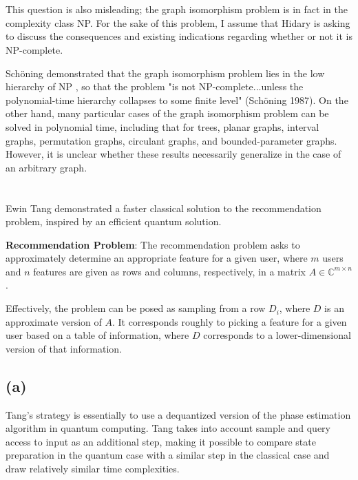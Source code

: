 \documentclass{article}
\begin{document}
 
\section{}

This question is also misleading; the graph isomorphism problem is in fact in the complexity class NP. For the sake of this problem, I assume that Hidary is asking to discuss the consequences and existing indications regarding whether or not it is NP-complete.

Schöning demonstrated that the graph isomorphism problem lies in the low hierarchy of NP , so that the problem "is not NP-complete...unless the polynomial-time hierarchy collapses to some finite level" (Schöning 1987). On the other hand, many particular cases of the graph isomorphism problem can be solved in polynomial time, including that for trees, planar graphs, interval graphs, permutation graphs, circulant graphs, and bounded-parameter graphs. However, it is unclear whether these results necessarily generalize in the case of an arbitrary graph.

\section{}
Ewin Tang demonstrated a faster classical solution to the recommendation problem, inspired by an efficient quantum solution.

\textbf{Recommendation Problem}: The recommendation problem asks to approximately determine an appropriate feature for a given user, where $m$ users and $n$ features are given as rows and columns, respectively, in a matrix $A\in \mathbb{C}^{m\times n}$.

Effectively, the problem can be posed as sampling from a row $D_i$, where $D$ is an approximate version of $A$. It corresponds roughly to picking a feature for a given user based on a table of information, where $D$ corresponds to a lower-dimensional version of that information.

\subsection{(a)}

Tang's strategy is essentially to use a dequantized version of the phase estimation algorithm in quantum computing. Tang takes into account sample and query access to input as an additional step, making it possible to compare state preparation in the quantum case with a similar step in the classical case and draw relatively similar time complexities.
\end{document}
